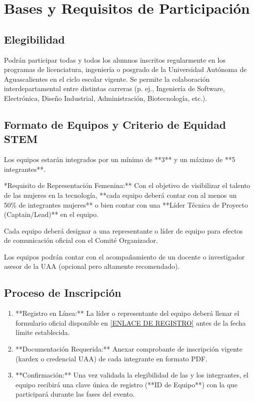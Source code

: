 \documentclass[11pt,letterpaper]{article}
\begin{document}
\section{Bases y Requisitos de Participación}

\subsection{Elegibilidad}
Podrán participar todas y todos los alumnos inscritos regularmente en los programas de licenciatura, ingeniería o posgrado de la Universidad Autónoma de Aguascalientes en el ciclo escolar vigente. Se permite la colaboración interdepartamental entre distintas carreras (p. ej., Ingeniería de Software, Electrónica, Diseño Industrial, Administración, Biotecnología, etc.).

\subsection{Formato de Equipos y Criterio de Equidad STEM}
\begin{checklist}
    \item Los equipos estarán integrados por un mínimo de **3** y un máximo de **5 integrantes**.
    \item **Requisito de Representación Femenina:** Con el objetivo de visibilizar el talento de las mujeres en la tecnología, **cada equipo deberá contar con al menos un 50\% de integrantes mujeres** o bien contar con una **Líder Técnica de Proyecto (Captain/Lead)** en el equipo.
    \item Cada equipo deberá designar a una representante o líder de equipo para efectos de comunicación oficial con el Comité Organizador.
    \item Los equipos podrán contar con el acompañamiento de un docente o investigador asesor de la UAA (opcional pero altamente recomendado).
\end{checklist}

\subsection{Proceso de Inscripción}
\begin{enumerate}
    \item **Registro en Línea:** La líder o representante del equipo deberá llenar el formulario oficial disponible en \url{[ENLACE DE REGISTRO]} antes de la fecha límite establecida.
    \item **Documentación Requerida:** Anexar comprobante de inscripción vigente (kardex o credencial UAA) de cada integrante en formato PDF.
    \item **Confirmación:** Una vez validada la elegibilidad de las y los integrantes, el equipo recibirá una clave única de registro (**ID de Equipo**) con la que participará durante las fases del evento.
\end{enumerate}
\end{document}

